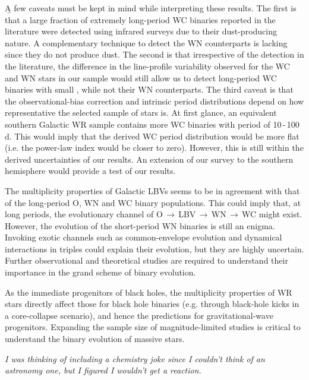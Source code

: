 \b{A few caveats must be kept in mind while interpreting these results. The first is that a large fraction of extremely long-period WC binaries reported in the literature were detected using infrared surveys due to their dust-producing nature. A complementary technique to detect the WN counterparts is lacking since they do not produce dust. The second is that irrespective of the detection in the literature, the difference in the line-profile variability observed for the WC and WN stars in our sample would still allow us to detect long-period WC binaries with small \DelRV{}, while not their WN counterparts. The third caveat is that the observational-bias correction and intrinsic period distributions depend on how representative the selected sample of stars is. At first glance, an equivalent southern Galactic WR sample contains more WC binaries with period of 10\,-\,100\,d. This would imply that the derived WC period distribution would be more flat (i.e. the power-law index would be closer to zero). However, this is still within the derived uncertainties of our results. An extension of our survey to the southern hemisphere would provide a test of our results.}

The multiplicity properties of Galactic LBVs \citep{mahy_multiplicity_2022} seems to be in agreement with that of the long-period O, WN and WC binary populations. This could imply that, at long periods, the evolutionary channel of O$\,\xrightarrow{}$\,LBV\,$\xrightarrow{}$\,WN\,$\xrightarrow{}$\,WC might exist. However, the evolution of the short-period WN binaries is still an enigma. Invoking exotic channels such as common-envelope evolution and dynamical interactions in triples could explain their evolution, but they are highly uncertain. Further observational and theoretical studies are required to understand their importance in the grand scheme of binary evolution.

As the immediate progenitors of black holes, the multiplicity properties of WR stars directly affect those for black hole binaries (e.g. through black-hole kicks in a core-collapse scenario), and hence the predictions for gravitational-wave progenitors. Expanding the sample size of magnitude-limited studies is critical to understand the binary evolution of massive stars.

\clearpage
\thispagestyle{empty}
\hspace{0pt}
\vfill
\textit{I was thinking of including a chemistry joke since I couldn't think of an astronomy one, but I figured I wouldn't get a reaction.}
\vfill
\clearpage
